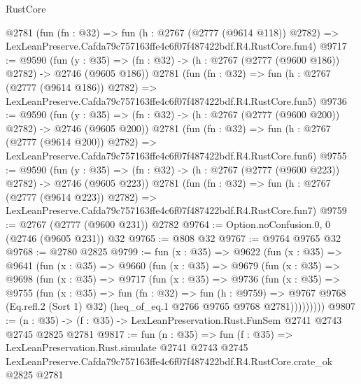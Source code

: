 \begin{lexlean}{RustCore}
\begin{coremodule}
    @2781
    (fun (fn : @32) =>
    fun (h : @2767 (@2777 (@9614 @118)) @2782) =>
    LexLeanPreserve.Cafda79c757163ffe4c6f07f487422bdf.R4.RustCore.fun4)
@9717 := @9590
    (fun (y : @35) => (fn : @32) -> (h : @2767 (@2777 (@9600 @186)) @2782) -> @2746 (@9605 @186))
    @2781
    (fun (fn : @32) =>
    fun (h : @2767 (@2777 (@9614 @186)) @2782) =>
    LexLeanPreserve.Cafda79c757163ffe4c6f07f487422bdf.R4.RustCore.fun5)
@9736 := @9590
    (fun (y : @35) => (fn : @32) -> (h : @2767 (@2777 (@9600 @200)) @2782) -> @2746 (@9605 @200))
    @2781
    (fun (fn : @32) =>
    fun (h : @2767 (@2777 (@9614 @200)) @2782) =>
    LexLeanPreserve.Cafda79c757163ffe4c6f07f487422bdf.R4.RustCore.fun6)
@9755 := @9590
    (fun (y : @35) => (fn : @32) -> (h : @2767 (@2777 (@9600 @223)) @2782) -> @2746 (@9605 @223))
    @2781
    (fun (fn : @32) =>
    fun (h : @2767 (@2777 (@9614 @223)) @2782) =>
    LexLeanPreserve.Cafda79c757163ffe4c6f07f487422bdf.R4.RustCore.fun7)
@9759 := @2767 (@2777 (@9600 @231)) @2782
@9764 := Option.noConfusion.{0, 0} (@2746 (@9605 @231)) @32
@9765 := @808 @32
@9767 := @9764 @9765 @32
@9768 := @2780 @2825
@9799 := fun (x : @35) =>
  @9622
    (fun (x : @35) =>
    @9641
      (fun (x : @35) =>
      @9660
        (fun (x : @35) =>
        @9679
          (fun (x : @35) =>
          @9698
            (fun (x : @35) =>
            @9717
              (fun (x : @35) =>
              @9736
                (fun (x : @35) =>
                @9755
                  (fun (x : @35) =>
                  fun (fn : @32) =>
                  fun (h : @9759) =>
                  @9767
                    @9768
                    (Eq.refl.{2} (Sort 1) @32)
                    (heq_of_eq.{1} @2766 @9765 @9768 @2781)))))))))
@9807 := (n : @35) -> (f : @35) -> LexLeanPreservation.Rust.FunSem @2741 @2743 @2745 @2825 @2781
@9817 := fun (n : @35) =>
  fun (f : @35) =>
  LexLeanPreservation.Rust.simulate
    @2741
    @2743
    @2745
    LexLeanPreserve.Cafda79c757163ffe4c6f07f487422bdf.R4.RustCore.crate_ok
    @2825
    @2781
\end{coremodule}
\end{lexlean}
